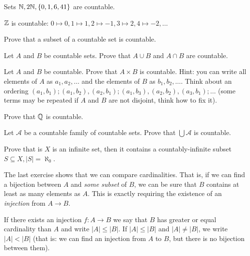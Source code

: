 \begin{example}
  Sets $\mathbb N, 2\mathbb N, \{0,1,6, 41\}$ are countable.
\end{example}

\begin{example}
  $\mathbb Z$ is countable: $0\mapsto 0, 1\mapsto 1, 2\mapsto -1, 3\mapsto 2, 4\mapsto -2,\dots$
\end{example}

\begin{exercise}
  Prove that a subset of a countable set is countable.
\end{exercise}

\begin{exercise}
  Let $A$ and $B$ be countable sets. Prove that $A\cup B$ and $A\cap B$ are countable.
\end{exercise}

\begin{exercise}
  Let $A$ and $B$ be countable. Prove that $A\times B$ is countable. Hint: you can write all elements of $A$ as $a_1,a_2,\dots$ and the elements of $B$ as $b_1, b_2,\dots$.
  Think about an ordering $(a_1,b_1); (a_1, b_2), (a_2, b_1); (a_1, b_3), (a_2, b_2), (a_3, b_1); \dots$ (some terms may be repeated if $A$ and $B$ are not disjoint, think how to fix it).
\end{exercise}

\begin{exercise}
  Prove that $\mathbb Q$ is countable.
\end{exercise}

\begin{exercise}
  Let $\mathcal A$ be a countable family of countable sets. Prove that $\bigcup \mathcal A$ is countable.
\end{exercise}

\begin{exercise}
  Prove that is $X$ is an infinite set, then it contains a countably-infinite subset $S\subseteq X, |S|=\aleph_0$.
\end{exercise}

The last exercise shows that we can compare cardinalities. That is, if we can find a bijection between $A$ and \textit{some subset} of $B$, we can be sure that $B$ contains at least
as many elements as $A$. This is exactly requiring the existence of an \textit{injection} from $A\to B$.

\begin{definition}
  If there exists an injection $f:A\to B$ we say that $B$ has greater or equal cardinality than $A$ and write $|A|\le |B|$. If $|A|\le |B|$ and $|A|\neq |B|$, we write
  $|A| < |B|$ (that is: we can find an injection from $A$ to $B$, but there is no bijection between them).
\end{definition}

